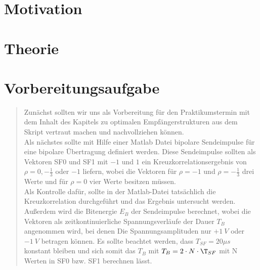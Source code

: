 \section{Motivation}
\begin{quote}
	
	
	
\end{quote} %



\section{Theorie}
\begin{quote}

	
	
	\end{quote}%

\section{Vorbereitungsaufgabe}
\begin{quote}
	
	Zunächst sollten wir uns als Vorbereitung für den Praktikumstermin mit dem
	Inhalt des Kapitels zu optimalen Empfängerstrukturen aus dem Skript vertraut
	machen und nachvollziehen können.\\
	
	Als nächstes sollte mit Hilfe einer Matlab Datei bipolare Sendeimpulse
	für eine bipolare Übertragung definiert werden. Diese Sendeimpulse sollten als
	Vektoren SF0 und SF1 mit $-1$ und $1$ ein Kreuzkorrelationsergebnis von $\rho
	= 0, -\frac{1}{3}$ oder $-1$ liefern, wobei die Vektoren für $\rho = -1$ und
	$\rho = -\frac{1}{3}$ drei Werte und für $\rho = 0$ vier Werte besitzen
	müssen.\\
	Als Kontrolle dafür, sollte in der Matlab-Datei tatsächlich die
	Kreuzkorrelation durchgeführt und das Ergebnis untersucht werden. Außerdem wird
	die Bitenergie $E_B$ der Sendeimpulse berechnet, wobei die Vektoren als
	zeitkontinuierliche Spannungsverläufe der Dauer $T_B$ angenommen wird, bei
	denen Die Spannungsamplituden nur $+1\ V$ oder $-1\ V$ betragen können.
	Es sollte beachtet werden, dass $T_{SF} = 20\mu s$ konstant bleiben und sich
	somit das $T_B$ mit $T_B = 2 \cdot N \cdot \T_{SF}$ mit N Werten in SF0 bzw.
	SF1 berechnen lässt.
	
\end{quote}%

